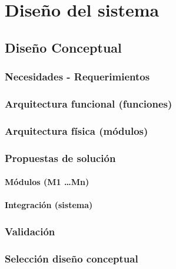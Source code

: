 
\chapter{Diseño del sistema}
%
\section{Diseño Conceptual}
%
\subsection{Necesidades - Requerimientos}
%
\subsection{Arquitectura funcional (funciones)}

\subsection{Arquitectura física (módulos)}

\subsection{Propuestas de solución}

\subsubsection{Módulos (M{1}  \dots M{n})}

\subsubsection{Integración (sistema)}


\subsection{Validación}

\subsection{Selección diseño conceptual}



\endinput